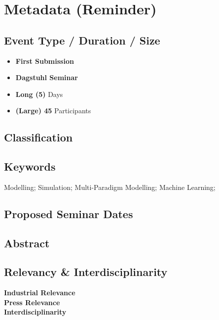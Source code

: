 \section{Metadata (Reminder)}
\label{sec:Metadata}

\subsection{Event Type / Duration / Size}
\label{sec:EventTypeDurationSize}

\begin{itemize}
	\item \textbf{First Submission}
	\item \textbf{Dagstuhl Seminar}
	\item \textbf{Long (5)} Days
	\item \textbf{(Large) 45} Participants
\end{itemize}

\subsection{Classification}
\label{sec:Classification}



\subsection{Keywords}
\label{sec:Keywords}

Modelling; Simulation; Multi-Paradigm Modelling; Machine Learning; 

\subsection{Proposed Seminar Dates}
\label{sec:ProposedDates}

\subsection{Abstract}
\label{sec:Abstract}



\subsection{Relevancy \& Interdisciplinarity}
\label{sec:Relevancy-Interdisciplinarity}

\begin{description}
	\item[\textbf{Industrial Relevance}]
	
	\item[\textbf{Press Relevance}]
	
	\item[\textbf{Interdisciplinarity}] 
\end{description}


